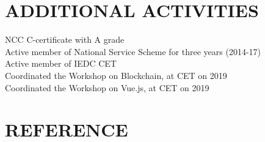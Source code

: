 \documentclass[margin]{res}
\begin{document}
\section{ADDITIONAL ACTIVITIES}
    \textbullet{} NCC C-certificate with A grade \\
    \textbullet{} Active member of National Service Scheme for three years (2014-17) \\
    \textbullet{} Active member of IEDC CET \\
    \textbullet{} Coordinated the Workshop on Blockchain, at CET on 2019 \\
    \textbullet{} Coordinated the Workshop on Vue.js, at CET on 2019 

\section{REFERENCE}
    \sl {}
\end{document}
